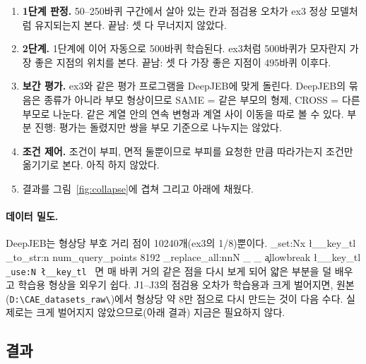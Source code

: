 \documentclass[11pt]{article}
\DeclareRobustCommand{\key}[1]{
  \tl_set:Nx \l__key_tl { \tl_to_str:n {#1} }
  \regex_replace_all:nnN { \_ } { \cO\_ \c{allowbreak} } \l__key_tl
  \texttt{ \tl_use:N \l__key_tl }
}
\begin{document}
\begin{enumerate}
\item \textbf{1단계 판정.} 50--250바퀴 구간에서 살아 있는 칸과 점검용 오차가 ex3 정상 모델처럼 유지되는지 본다. 끝남: 셋 다 무너지지 않았다.
\item \textbf{2단계.} 1단계에 이어 자동으로 500바퀴 학습된다. ex3처럼 500바퀴가 모자란지 가장 좋은 지점의 위치를 본다. 끝남: 셋 다 가장 좋은 지점이 495바퀴 이후다.
\item \textbf{보간 평가.} ex3와 같은 평가 프로그램을 DeepJEB에 맞게 돌린다. DeepJEB의 묶음은 종류가 아니라 부모 형상이므로
SAME = 같은 부모의 형제, CROSS = 다른 부모로 나눈다. 같은 계열 안의 연속 변형과 계열 사이 이동을 따로 볼 수 있다. 부분 진행: 평가는 돌렸지만 쌍을 부모 기준으로 나누지는 않았다.
\item \textbf{조건 제어.} 조건이 부피, 면적 둘뿐이므로 부피를 요청한 만큼 따라가는지 조건만 옮기기로 본다. 아직 하지 않았다.
\item 결과를 그림~\ref{fig:collapse}에 겹쳐 그리고 아래에 채웠다.
\end{enumerate}

\paragraph{데이터 밀도.} DeepJEB는 형상당 부호 거리 점이 10240개(ex3의 1/8)뿐이다. \key{num_query_points 8192}면 매 바퀴 거의 같은 점을
다시 보게 되어 얇은 부분을 덜 배우고 학습용 형상을 외우기 쉽다. J1--J3의 점검용 오차가 학습용과 크게 벌어지면, 원본
(\texttt{D:\textbackslash CAE\_datasets\_raw\textbackslash})에서 형상당 약 8만 점으로 다시 만드는 것이 다음 수다. 실제로는 크게 벌어지지 않았으므로(아래 결과) 지금은 필요하지 않다.

\subsection{결과}
\end{document}

